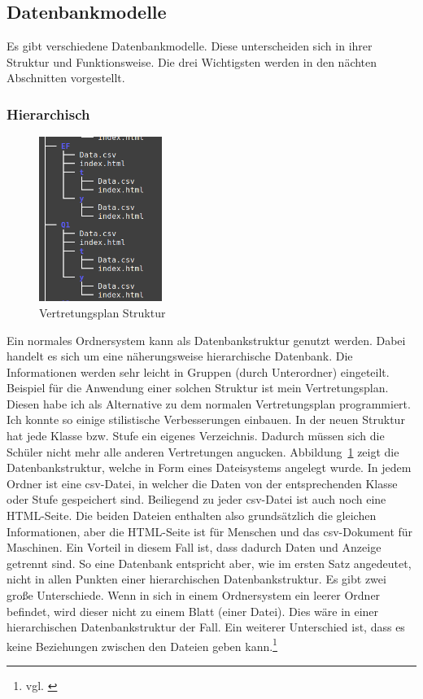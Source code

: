 \documentclass[a4paper, 12pt]{article}
\theoremstyle{plain}
\theoremstyle{definition}
\begin{document}
	
	
	\subsection{Datenbankmodelle}
	\label{sec:dbMod}
	Es gibt verschiedene Datenbankmodelle. Diese unterscheiden sich in ihrer Struktur und Funktionsweise. Die drei Wichtigsten werden in den nächten Abschnitten vorgestellt.
	
	\subsubsection{Hierarchisch}
	\label{sec:hierdb}
	
	\begin{figure}
	\vspace{-13pt}
	\includegraphics[width=4cm]{vertretungTree.png}
	\vspace{-30pt}
	\caption{Vertre\-tungsplan Struktur}\label{fig:verTree}
	\end{figure}
	Ein normales Ordnersystem kann als Datenbankstruktur genutzt werden. Dabei handelt es sich um eine näherungsweise hierarchische Datenbank. Die Informationen werden sehr leicht in Gruppen (durch Unterordner) eingeteilt. Beispiel für die Anwendung einer solchen Struktur ist mein Vertretungsplan. Diesen habe ich als Alternative zu dem normalen Vertretungsplan programmiert. Ich konnte so einige stilistische Verbesserungen einbauen. In der neuen Struktur hat jede Klasse bzw. Stufe ein eigenes Verzeichnis. Dadurch müssen sich die Schüler nicht mehr alle anderen Vertretungen angucken.  Abbildung~\ref{fig:verTree} zeigt die Datenbankstruktur, welche in Form eines Dateisystems angelegt wurde. In jedem Ordner ist eine csv-Datei, in welcher die Daten von der entsprechenden Klasse oder Stufe gespeichert sind. Beiliegend zu jeder csv-Datei ist auch noch eine HTML-Seite. Die beiden Dateien enthalten also grundsätzlich die gleichen Informationen, aber die HTML-Seite ist für Menschen und das csv-Dokument für Maschinen. Ein Vorteil in diesem Fall ist, dass dadurch Daten und Anzeige getrennt sind. So eine Datenbank entspricht aber, wie im ersten Satz angedeutet, nicht in allen Punkten einer hierarchischen Datenbankstruktur. Es gibt zwei große Unterschiede. Wenn in sich in einem Ordnersystem ein leerer Ordner befindet, wird dieser nicht zu einem Blatt (einer Datei). Dies wäre in einer hierarchischen Datenbankstruktur der Fall. Ein weiterer Unterschied ist, dass es keine Beziehungen zwischen den Dateien geben kann.\footnote{vgl. \cite{hierDbWiki}}\\
\end{document}
